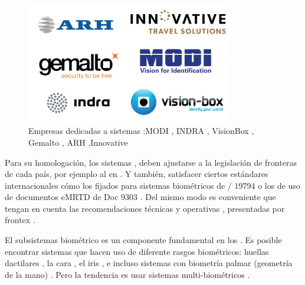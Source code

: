 \begin{figure}[t]
    \centering
    \includegraphics[width=0.8\textwidth]{ch-sistemasABC/images/ch-SistemasABC/LOGOS_EMPRESAS.png}
    \caption{Empresas dedicadas a sistemas :\Gls{MODI} \cite{MODIOnline}, \Gls{INDRA} \cite{indraOnline}, \Gls{VisionBox} \cite{visionBoxOnline}, \Gls{Gemalto} \cite{gemaltoOnline}, \Gls{ARH} \cite{ARHOnline},\Gls{Innovative} \cite{InnovativeOnline}}
    \label{fig:logosEmpresasABC}
\end{figure}

Para su homologación, los sistemas , deben ajustarse a la legislación de fronteras de cada país, por ejemplo al  \cite{SBCode2016} en . Y también, satisfacer ciertos estándares internacionales cómo los fijados para sistemas biométricos de / $19794$ \cite{ISO/Biometric} o los de uso de documentos \gls{eMRTD} de  Doc $9303$ \cite{doc20069303}. Del mismo modo es conveniente que tengan en cuenta las recomendaciones técnicas \cite{FRONTEX2016TechReport} y operativas \cite{FRONTEX2016OpeReport}, presentadas por \Gls{frontex} \cite{FRONTEXOnLine}. 

El subsistemas biométrico es un componente fundamental en los  \cite{labati2016biometric} \cite{spreeuwers2012evaluation}. Es posible encontrar sistemas que hacen uso de diferente rasgos biométricos: huellas dactilares \cite{anand2016enhancing} \cite{gamassi2005robust}, la cara \cite{del2015face} \cite{del2016automated} \cite{kosmerlj2006face}, el iris \cite{daugman2015iris} \cite{palmer2012ten} \cite{matey2006iris}, e incluso sistemas con biometría palmar (geometría de la mano) \cite{nanavati2011biometric}. Pero la tendencia es usar sistemas multi-biométricos \cite{cantarero2013multi} \cite{cimato2006personal} \cite{cimato2008privacy} \cite{gamassi2004high} \cite{gamassi2005multi}.


